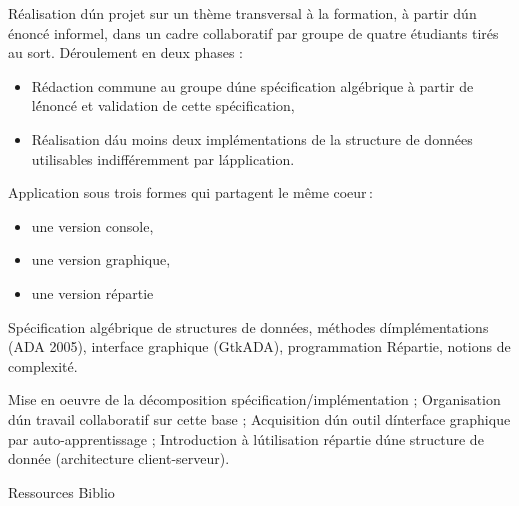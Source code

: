 {
Réalisation d\'un projet sur un thème transversal à la formation, à partir
d\'un énoncé informel, dans un cadre collaboratif par groupe de quatre
étudiants tirés au sort.
Déroulement en deux phases :
\begin{itemize} 
\item Rédaction commune au groupe d\'une spécification algébrique à partir de
l\'énoncé et validation de cette spécification,
\item Réalisation d\'au moins deux implémentations de la structure de données
utilisables indifféremment par l\'application.
\end{itemize} 
Application sous trois formes qui partagent le même coeur\,:
\begin{itemize} 
\item une version console,
\item une version graphique,
\item une version répartie
\end{itemize}
} 
{Spécification algébrique de structures de données, méthodes
d\'implémentations (ADA 2005), interface graphique (GtkADA),
programmation Répartie, notions de complexité.} 
{\begin{itemize} 
  \ObjItem Mise en oeuvre de la décomposition spécification/implémentation ;
  \ObjItem Organisation d\'un travail collaboratif sur cette base ;
  \ObjItem Acquisition d\'un outil d\'interface graphique par auto-apprentissage ;
  \ObjItem Introduction à l\'utilisation répartie d\'une structure de donnée (architecture client-serveur).
\end{itemize} 
} 
{Ressources} 
{Biblio} 
 
\vfill

